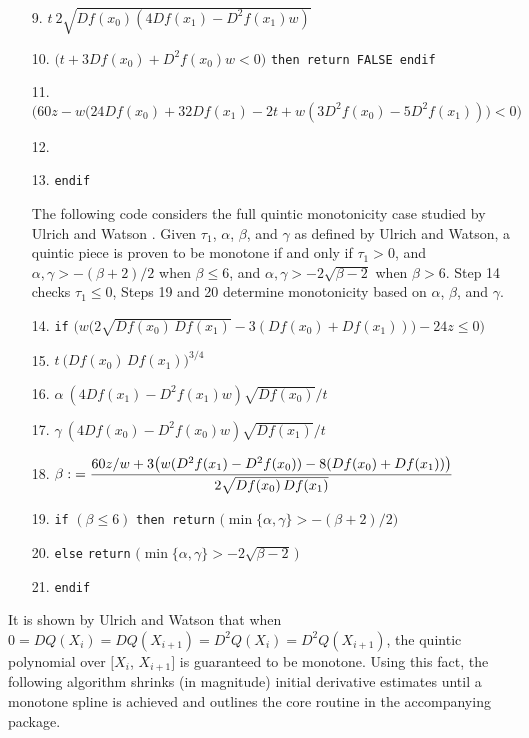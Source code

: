 {\begin{itemize}
{{return FALSE endif}}
\item[9.]{ \codent $t \: 2 \sqrt{Df(x_0) (4Df(x_1) - D^2f(x_1) w) }$}
\item[10.]{  $\bigl(t + 3Df(x_0) + D^2f(x_0)w < 0 \bigr)$
  {\tt then return FALSE endif}}
\item[11.]{  $\bigl(60z - w\bigl(24Df(x_0) + 32Df(x_1) - 2t
  + w(3D^2f(x_0) - 5D^2f(x_1))\bigr) < 0\bigr)$}
\item[]{   \codent {}}
\item[12.]{ }
\item[13.]{ {\tt endif}
}
\item[]{ {The following code considers the full quintic monotonicity
case studied by Ulrich and Watson \cite{ulrich1994positivity}. Given $\tau_1$, $\alpha$,
$\beta$, and $\gamma$ as defined by Ulrich and Watson, a quintic
piece is proven to be monotone if and only if
$\tau_1 > 0$, and $\alpha, \gamma > -(\beta+2)/2$ when $\beta \leq 6$,
and $\alpha, \gamma > -2 \sqrt{\beta-2}$ when $\beta > 6$.
Step 14 checks $\tau_1 \le 0$, Steps 19 and 20 determine monotonicity based
on $\alpha$, $\beta$, and $\gamma$.}
}
\item[14.]{ {\tt if} $\bigl( w\bigl(2\sqrt{Df(x_0)\,Df(x_1)} - 3(Df(x_0) +
  Df(x_1))\bigr) - 24z \leq 0 \bigr)$}
\item[]{ }
\item[15.]{ $t \: \bigl(Df(x_0)\, Df(x_1)\bigr)^{3/4}$}
\item[16.]{ $\alpha \: (4 Df(x_1) - D^2f(x_1)w) \sqrt{Df(x_0)} / t$}
\item[17.]{ $\gamma \: (4 Df(x_0) - D^2f(x_0)w) \sqrt{Df(x_1)} / t$}
\item[18.]{ $\displaystyle \beta \: {60z/w + 3\bigl(w(D^2f(x_1) -
  D^2f(x_0)) - 8(Df(x_0) + Df(x_1))\bigr) \over 2 \sqrt{Df(x_0)\,Df(x_1)}}$}
\item[19.]{ {\tt if} $(\beta \leq 6)$ {\tt then return}
$\bigl( \min\{\alpha,\gamma\} > - (\beta + 2) / 2 \bigr)$}
\item[20.]{ {\tt else} {\tt return}
$\bigl( \min\{\alpha,\gamma\} > -2 \sqrt{\beta - 2}\,\bigr)$}
\item[21.]{ {\tt endif}}
\end{itemize}
}
\vskip 5mm

It is shown by Ulrich and Watson \cite{ulrich1994positivity} that when
$0 = DQ(X_i) = DQ(X_{i+1}) = D^2Q(X_i) = D^2Q(X_{i+1})$, the quintic
polynomial over $[X_i$, $X_{i+1}]$ is guaranteed to be monotone. Using
this fact, the following algorithm shrinks (in magnitude) initial
derivative estimates until a monotone spline is achieved and outlines
the core routine in the accompanying package.


